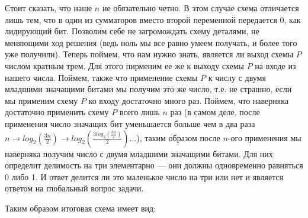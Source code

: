 \documentclass{article}
\newcommand{\half}[1]{\frac{#1}{2}}
\begin{document}
    Стоит сказать, что наше $n$ не обязательно четно. В этом случае схема отличается лишь тем, что в один из сумматоров вместо второй переменной передается 0, как лидирующий бит. Позволим себе не загромождать схему деталями, не меняющими ход решения (ведь ноль мы все равно умеем получать, и более того уже получили). Теперь поймем, что нам нужно знать, является ли выход схемы $P$ числом кратным трем. 
    Для этого пирменим ее же к выходу схемы $P$ на входе из нашего числа. Поймем, также что применение схемы $P$ к числу с двумя младшими значащими битами мы получим это же число, т.е. не страшно, если мы применим схему $P$ ко входу достаточно много раз.
     Поймем, что наверняка достаточно применить схему $P$ всего лишь $n$ раз (в самом деле, после применения число значащих бит уменьшается больше чем в два раза $n \rightarrow log_2(\half{3n}) \rightarrow log_2(\half{3log_2(\half{3n})}) \ldots$), таким образом после $n$-ого применения мы наверняка получим число с двумя младшими значащими битами. Для них определит делимость на три элементарно --- они должны  одновременно равняться 0 либо 1. И ответ делится ли это маленькое число на три или нет и является ответом на глобальный вопрос задачи.

    Таким образом итоговая схема имеет вид:
\end{document}
